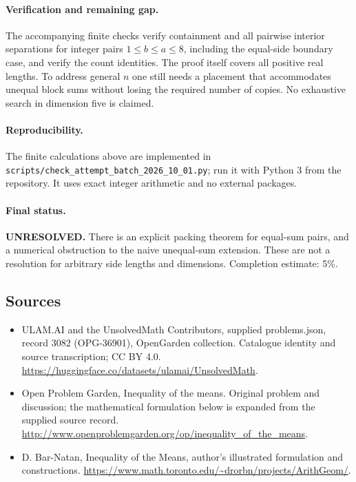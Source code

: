 \documentclass[11pt,a4paper]{article}
\begin{document}
\paragraph{Verification and remaining gap.}
The accompanying finite checks verify containment and all pairwise interior
separations for integer pairs $1\le b\le a\le8$, including the equal-side
boundary case, and verify the count identities. The proof itself covers
all positive real lengths. To address general $n$ one still needs a placement
that accommodates unequal block sums without losing the required number of
copies. No exhaustive search in dimension five is claimed.

\paragraph{Reproducibility.}
The finite calculations above are implemented in
\texttt{scripts/check\_attempt\_batch\_2026\_10\_01.py}; run it with Python 3
from the repository. It uses exact integer arithmetic and no external packages.

\paragraph{Final status.}
\textbf{UNRESOLVED.} There is an explicit packing theorem for equal-sum pairs,
and a numerical obstruction to the naive unequal-sum extension. These are
not a resolution for arbitrary side lengths and dimensions. Completion
estimate: 5\%.

\subsection{Sources}
\begin{itemize}
\item[S1] ULAM.AI and the UnsolvedMath Contributors, supplied problems.json, record 3082 (OPG-36901), OpenGarden collection. Catalogue identity and source transcription; CC BY 4.0.
\url{https://huggingface.co/datasets/ulamai/UnsolvedMath}.
\item[S2] Open Problem Garden, Inequality of the means. Original problem and discussion; the mathematical formulation below is expanded from the supplied source record.
\url{http://www.openproblemgarden.org/op/inequality_of_the_means}.
\item[S3] D. Bar-Natan, Inequality of the Means, author’s illustrated formulation and constructions.
\url{https://www.math.toronto.edu/~drorbn/projects/ArithGeom/}.

\end{itemize}
\end{document}
